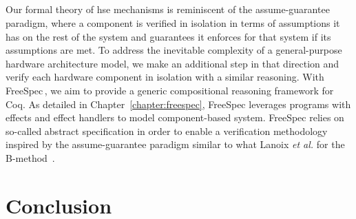 %

\subsection*{}

Our formal theory of \ac{hse} mechanisms is reminiscent of the assume-guarantee
paradigm, where a component is verified in isolation in terms of assumptions it
has on the rest of the system and guarantees it enforces for that system if its
assumptions are met.
%
To address the inevitable complexity of a general-purpose hardware architecture
model, we make an additional step in that direction and verify each hardware
component in isolation with a similar reasoning. 
%
With FreeSpec\,\cite{letan2018freespeccode}, we aim to provide a generic
compositional reasoning framework for Coq.
%
As detailed in Chapter~\ref{chapter:freespec}, FreeSpec leverages programs with
effects and effect handlers to model component-based system.
%
FreeSpec relies on so-called abstract specification in order to enable a
verification methodology inspired by the assume-guarantee paradigm similar to
what Lanoix \emph{et al.} for the B-method\,\cite{lanoix:hal-00105041} .

\section{Conclusion}
\label{sec:sota:conclusion}


